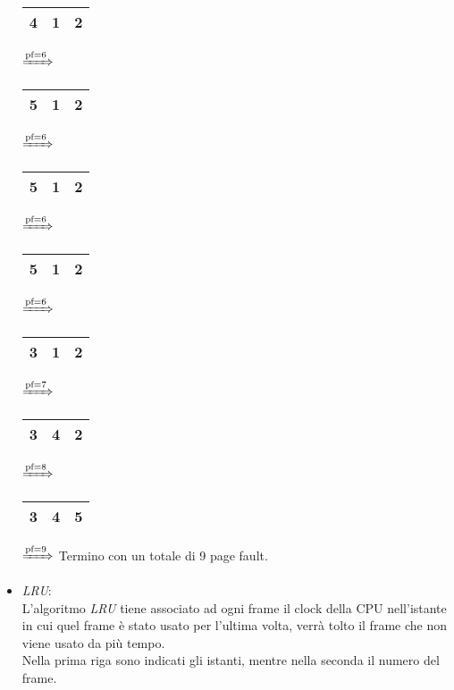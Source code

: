 \documentclass{article}
\begin{document}
\begin{itemize}
            \begin{tabular}{|c|c|c|}
                \hline
                4 & 1 & 2\\
                \hline
            \end{tabular}
            $\xRightarrow{\text{pf}=6}$
            \begin{tabular}{|c|c|c|}
                \hline
                5 & 1 & 2\\
                \hline
            \end{tabular}
            $\xRightarrow{\text{pf}=6}$
            \begin{tabular}{|c|c|c|}
                \hline
                5 & 1 & 2\\
                \hline
            \end{tabular}
            $\xRightarrow{\text{pf}=6}$
            \begin{tabular}{|c|c|c|}
                \hline
                5 & 1 & 2\\
                \hline
            \end{tabular}
            $\xRightarrow{\text{pf}=6}$
            \begin{tabular}{|c|c|c|}
                \hline
                3 & 1 & 2\\
                \hline
            \end{tabular}
            $\xRightarrow{\text{pf}=7}$
            \begin{tabular}{|c|c|c|}
                \hline
                3 & 4 & 2\\
                \hline
            \end{tabular}
            $\xRightarrow{\text{pf}=8}$
            \begin{tabular}{|c|c|c|}
                \hline
                3 & 4 & 5\\
                \hline
            \end{tabular}
            $\xRightarrow{\text{pf}=9}$
            Termino con un totale di 9 page fault.
        \item \emph{LRU}:\\
            L'algoritmo \emph{LRU} tiene associato ad ogni frame il clock della CPU nell'istante in cui quel frame è stato usato per l'ultima volta, verrà tolto il frame che non viene usato da più tempo.\\
            Nella prima riga sono indicati gli istanti, mentre nella seconda il numero del frame.\\

\end{itemize}
\end{document}
